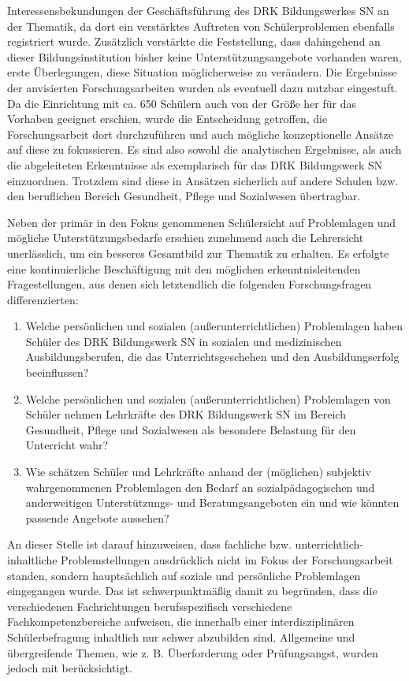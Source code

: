 Interessensbekundungen der Geschäftsführung des DRK Bildungswerkes SN an der Thematik, da dort ein verstärktes Auftreten von Schülerproblemen ebenfalls registriert wurde. Zusätzlich verstärkte die Feststellung, dass dahingehend an dieser Bildungsinstitution bisher keine Unterstützungsangebote vorhanden waren, erste Überlegungen, diese Situation möglicherweise zu verändern. Die Ergebnisse der anvisierten Forschungsarbeiten wurden als eventuell dazu nutzbar eingestuft. Da die Einrichtung mit ca. 650 Schülern auch von der Größe her für das Vorhaben geeignet erschien, wurde die Entscheidung getroffen, die Forschungsarbeit dort durchzuführen und auch mögliche konzeptionelle Ansätze auf diese zu fokussieren. Es sind also sowohl die analytischen Ergebnisse, als auch die abgeleiteten Erkenntnisse als exemplarisch für das DRK Bildungswerk SN einzuordnen. Trotzdem sind diese in Ansätzen sicherlich auf andere Schulen bzw. den beruflichen Bereich Gesundheit, Pflege und Sozialwesen übertragbar. 

Neben der primär in den Fokus genommenen Schülersicht auf Problemlagen und mögliche Unterstützungsbedarfe erschien zunehmend auch die Lehrersicht unerlässlich, um ein besseres Gesamtbild zur Thematik zu erhalten. Es erfolgte eine kontinuierliche Beschäftigung mit den möglichen erkenntnisleitenden Fragestellungen, aus denen sich letztendlich die folgenden Forschungsfragen differenzierten:

\begin{enumerate}
	\item Welche persönlichen und sozialen (außerunterrichtlichen) Problemlagen haben Schüler des DRK Bildungswerk SN in sozialen und medizinischen Ausbildungsberufen, die das Unterrichtsgeschehen und den Ausbildungserfolg beeinflussen?
	\item Welche persönlichen und sozialen (außerunterrichtlichen) Problemlagen von Schüler nehmen Lehrkräfte des DRK Bildungswerk SN im Bereich Gesundheit, Pflege und Sozialwesen als besondere Belastung für den Unterricht wahr?
	\item Wie schätzen Schüler und Lehrkräfte anhand der (möglichen) subjektiv wahrgenommenen Problemlagen den Bedarf an sozialpädagogischen und anderweitigen Unterstützungs- und Beratungsangeboten ein und wie könnten passende Angebote aussehen?
\end{enumerate}

\noindent
An dieser Stelle ist darauf hinzuweisen, dass fachliche bzw. unterrichtlich-inhaltliche Problemstellungen ausdrücklich nicht im Fokus der Forschungsarbeit standen, sondern hauptsächlich auf soziale und persönliche Problemlagen eingegangen wurde. Das ist schwerpunktmäßig damit zu begründen, dass die verschiedenen Fachrichtungen berufsspezifisch verschiedene Fachkompetenzbereiche aufweisen, die innerhalb einer interdisziplinären Schülerbefragung inhaltlich nur schwer abzubilden sind. Allgemeine und übergreifende Themen, wie z. B. Überforderung oder Prüfungsangst, wurden jedoch mit berücksichtigt.\\

